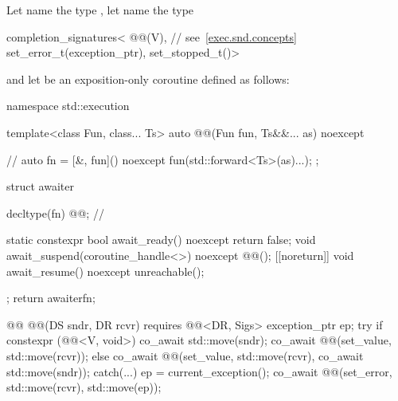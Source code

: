 \pnum
Let  name the type
,
let  name the type
\begin{codeblock}
completion_signatures<
  @@(V),         // see~\ref{exec.snd.concepts}
  set_error_t(exception_ptr),
  set_stopped_t()>
\end{codeblock}
and let  be an exposition-only coroutine
defined as follows:
\begin{codeblock}
namespace std::execution {
  template<class Fun, class... Ts>
  auto @@(Fun fun, Ts&&... as) noexcept {    // \expos
    auto fn = [&, fun]() noexcept { fun(std::forward<Ts>(as)...); };

    struct awaiter {
      decltype(fn) @@;                                     // \expos

      static constexpr bool await_ready() noexcept { return false; }
      void await_suspend(coroutine_handle<>) noexcept { @@(); }
      [[noreturn]] void await_resume() noexcept { unreachable(); }
    };
    return awaiter{fn};
  }

  @@ @@(DS sndr, DR rcvr) requires @@<DR, Sigs> {
    exception_ptr ep;
    try {
      if constexpr (@@<V, void>) {
        co_await std::move(sndr);
        co_await @@(set_value, std::move(rcvr));
      } else {
        co_await @@(set_value, std::move(rcvr), co_await std::move(sndr));
      }
    } catch(...) {
      ep = current_exception();
    }
    co_await @@(set_error, std::move(rcvr), std::move(ep));
  }
}
\end{codeblock}

